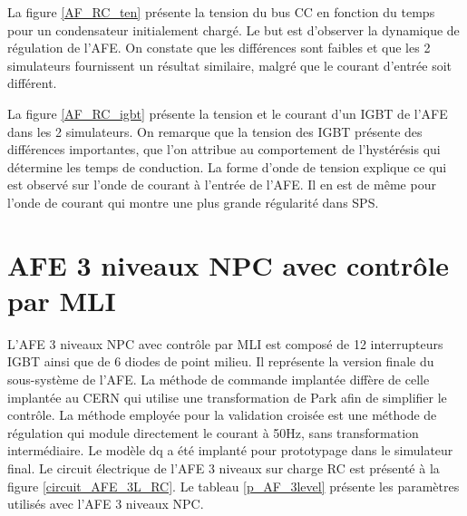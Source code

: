 La figure \ref{AF_RC_ten} présente la tension du bus CC en fonction du temps pour un condensateur initialement chargé. Le but est d'observer la dynamique de régulation de l'AFE. On constate que les différences sont faibles et que les 2 simulateurs fournissent un résultat similaire, malgré que le courant d'entrée soit différent.

La figure \ref{AF_RC_igbt} présente la tension et le courant d'un IGBT de l'AFE dans les 2 simulateurs. On remarque que la tension des IGBT présente des différences importantes, que l'on attribue au comportement de l'hystérésis qui détermine les temps de conduction. La forme d'onde de tension explique ce qui est observé sur l'onde de courant à l'entrée de l'AFE. Il en est de même pour l'onde de courant qui montre une plus grande régularité dans SPS.


\section{AFE 3 niveaux NPC avec contrôle par MLI}
L'AFE 3 niveaux NPC avec contrôle par MLI est composé de 12 interrupteurs IGBT ainsi que de 6 diodes de point milieu. Il représente la version finale du sous-système de l'AFE. La méthode de commande implantée diffère de celle implantée au CERN qui utilise une transformation de Park afin de simplifier le contrôle. La méthode employée pour la validation croisée est une méthode de régulation qui module directement le courant à 50Hz, sans transformation intermédiaire. Le modèle dq a été implanté pour prototypage dans le simulateur final. Le circuit électrique de l'AFE 3 niveaux sur charge RC est présenté à la figure \ref{circuit_AFE_3L_RC}. Le tableau \ref{p_AF_3level} présente les paramètres utilisés avec l'AFE 3 niveaux NPC.


